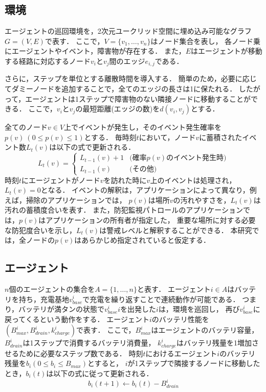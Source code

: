 \documentclass[12pt,a4j,twoside]{jarticle}
\def\AgentSet{A}
\def\BatteryLevel{b}
\begin{document}
\subsection{環境}
エージェントの巡回環境を，2次元ユークリッド空間に埋め込み可能なグラフ$G = (V,E)$で表す．
ここで，$V = \{v_1, \dots, v_n \}$はノード集合を表し，
各ノード乗にエージェントやイベント，障害物が存在する．
また，$E$はエージェントが移動する経路に対応するノード$v_i$と$v_j$間のエッジ$e_{i,j}$である．
\par

さらに，ステップを単位とする離散時間を導入する．
簡単のため，必要に応じてダミーノードを追加することで，全てのエッジの長さは1に保たれる．
したがって，エージェントは1ステップで障害物のない隣接ノードに移動することができる．
ここで，$v_i$と$v_j$の最短距離(エッジの数)を$d(v_i,v_j)$とする．
\par

全てのノード$v\in V$上でイベントが発生し，そのイベント発生確率を$p(v)~(0\leq p(v)\leq 1)$とする．
毎時刻$t$において，ノード$v$に蓄積されたイベント数$L_t(v)$は以下の式で更新される．
%
\[
L_t(v) = \left\{
\begin{array}{ll}
  L_{t-1}(v) + 1 & \textrm{(確率$p(v)$のイベント発生時)} \\
  L_{t-1}(v) & \textrm{(その他)}
\end{array}
\right.
\]
%
時刻$t$にエージェントがノード$v$を訪れた時に$v$上のイベントは処理され，$L_t(v) = 0$となる．
イベントの解釈は，アプリケーションによって異なり，例えば，掃除のアプリケーションでは，
$p(v)$は場所$v$の汚れやすさを，$L_t(v)$は汚れの蓄積度合いを表す．
また，防犯監視パトロールのアプリケーションでは，$p(v)$はアプリケーションの所有者が指定した，
重要な場所に対する必要な防犯度合いを示し，$L_t(v)$は警戒レベルと解釈することができる．
本研究では，全ノードの$p(v)$はあらかじめ指定されていると仮定する．

\subsection{エージェント}
$n$個のエージェントの集合を$\AgentSet=\{1,\dots ,n\}$と表す．
エージェント$i\in\AgentSet$はバッテリを持ち，充電基地$v^i_{base}$で充電を繰り返すことで連続動作が可能である．
つまり，バッテリが満タンの状態で$v^i_{base}i$を出発した$i$は，環境を巡回し，
再び$v^i_{base}$に戻ってくるという動作をする．
エージェント$i$のバッテリ性能を$(B^i_{max}, B^i_{drain}, k^i_{charge})$で表す．
ここで，$B^i_{max}$はエージェントのバッテリ容量，$B^i_{drain}$は1ステップで消費するバッテリ消費量，
$k^i_{charge}$はバッテリ残量を1増加させるために必要なステップ数である．
時刻$t$におけるエージェント$i$のバッテリ残量を$\BatteryLevel_i (0 \leq \BatteryLevel_i \leq B_{max})$とすると，
$i$が1ステップで隣接するノードに移動したとき，$\BatteryLevel_i(t)$は以下の式に従って更新される．
%
\begin{equation}
  \BatteryLevel_i(t+1) \gets \BatteryLevel_i(t) - B^i_{drain}
\end{equation}
%
\par
\end{document}
